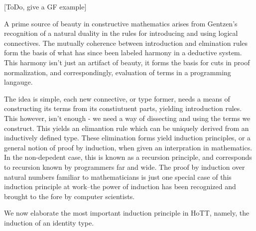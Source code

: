 \documentclass[11pt, a4paper]{article}
\begin{document}
[ToDo, give a GF example]

A prime source of beauty in constructive mathematics arises from Gentzen's
recognition of a natural duality in the rules for introducing and using logical
connectives. The mutually coherence between introduction and elmination rules
form the basis of what has since been labeled harmony in a deductive system.
This harmony isn't just an artifact of beauty, it forms the basis for cuts in
proof normalization, and correspondingly, evaluation of terms in a programming
langauge. 

The idea is simple, each new connective, or type former, needs a means of
constructing its terms from its constiutuent parts, yielding introduction
rules. This however, isn't enough - we need a way of dissecting and using the
terms we construct. This yields an elimantion rule which can be uniquely
derived from an inductively defined type. These elimination forms yield
induction principles, or a general notion of proof by induction, when given an
interpration in mathematics. In the non-depedent case, this is known as a
recursion principle, and corresponds to recursion known by programmers far and
wide.  The proof by induction over natural numbers familiar to mathematicians
is just one special case of this induction principle at work--the power of
induction has been recognized and brought to the fore by computer scientists.

We now elaborate the most important induction principle in HoTT, namely, the
induction of an identity type.
\end{document}
